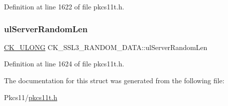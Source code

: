 Definition at line 1622 of file pkcs11t.\+h.

\mbox{\label{struct_c_k___s_s_l3___r_a_n_d_o_m___d_a_t_a_a2a275093e7bbe9297b76ed08a7056ceb}} 
\subsubsection{\texorpdfstring{ul\+Server\+Random\+Len}{ulServerRandomLen}}
{\footnotesize\ttfamily \hyperlink{pkcs11t_8h_a35181858a3b7a0a81f49d180d8f446ef}{C\+K\+\_\+\+U\+L\+O\+NG} C\+K\+\_\+\+S\+S\+L3\+\_\+\+R\+A\+N\+D\+O\+M\+\_\+\+D\+A\+T\+A\+::ul\+Server\+Random\+Len}



Definition at line 1624 of file pkcs11t.\+h.



The documentation for this struct was generated from the following file\+:\begin{DoxyCompactItemize}
\item 
Pkcs11/\hyperlink{pkcs11t_8h}{pkcs11t.\+h}\end{DoxyCompactItemize}
